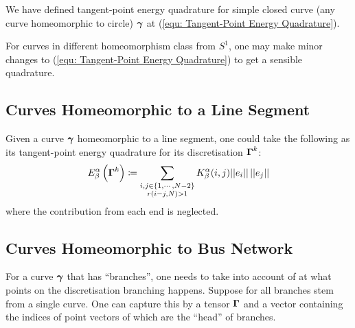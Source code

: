 \documentclass[../dissertation.tex]{subfiles}
\begin{document}
We have defined tangent-point energy quadrature for simple closed curve (any curve homeomorphic to circle) $\boldsymbol{\gamma}$ at (\ref{equ: Tangent-Point Energy Quadrature}).

For curves in different homeomorphism class from $S^1$,
one may make minor changes to (\ref{equ: Tangent-Point Energy Quadrature}) to get a sensible quadrature.

\subsection{Curves Homeomorphic to a Line Segment}
Given a curve $\boldsymbol{\gamma}$ homeomorphic to a line segment,
one could take the following as its tangent-point energy quadrature for its discretisation $\boldsymbol{\Gamma}^k$:
\begin{equation}
    E_{\beta}^{\alpha} \left( \boldsymbol{\Gamma}^k \right) \coloneqq \sum_{\substack{i,j \in \left\{ 1, \cdots, N-2 \right\} \\ r\left( i-j,N \right) > 1}} K_{\beta}^{\alpha} (i,j) \lvert \lvert e_i \rvert \rvert \, \lvert \lvert e_j \rvert \rvert
\end{equation}
where the contribution from each end is neglected.

\subsection{Curves Homeomorphic to Bus Network}
For a curve $\boldsymbol{\gamma}$ that has ``branches'', one needs to take into account of at what points on the discretisation branching happens.
Suppose for all branches stem from a single curve.
One can capture this by a tensor $\boldsymbol{\Gamma}$ and a vector containing the indices of point vectors of which are the ``head'' of branches.
\end{document}
